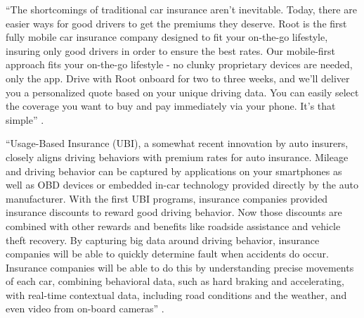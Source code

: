 ``The shortcomings of traditional car insurance aren’t inevitable. Today, there are easier ways for good drivers to get the premiums they deserve. Root is the first fully mobile car insurance company designed to fit your on-the-go lifestyle, insuring only good drivers in order to ensure the best rates. Our mobile-first approach fits your on-the-go lifestyle - no clunky proprietary devices are needed, only the app. Drive with Root onboard for two to three weeks, and we’ll deliver you a personalized quote based on your unique driving data. You can easily select the coverage you want to buy and pay immediately via your phone. It’s that simple'' \cite{Rippe2017unfair}.

``Usage-Based Insurance (UBI), a somewhat recent innovation by auto insurers, closely aligns driving behaviors with premium rates for auto insurance. Mileage and driving behavior can be captured by applications on your smartphones as well as OBD devices or embedded in-car technology provided directly by the auto manufacturer. With the first UBI programs, insurance companies provided insurance discounts to reward good driving behavior. Now those discounts are combined with other rewards and benefits like roadside assistance and vehicle theft recovery. By capturing big data around driving behavior, insurance companies will be able to quickly determine fault when accidents do occur. Insurance companies will be able to do this by understanding precise movements of each car, combining behavioral data, such as hard braking and accelerating, with real-time contextual data, including road conditions and the weather, and even video from on-board cameras'' \cite{Shafer2016industry}.

